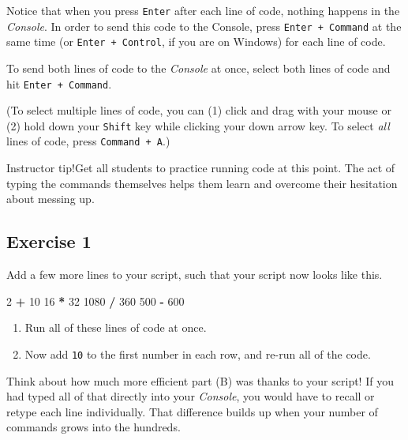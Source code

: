 \documentclass[
]{book}
\newenvironment{Shaded}{\begin{snugshade}}{\end{snugshade}}
\newcommand{\DecValTok}[1]{\textcolor[rgb]{0.00,0.00,0.81}{#1}}
\newcommand{\OperatorTok}[1]{\textcolor[rgb]{0.81,0.36,0.00}{\textbf{#1}}}
\newcommand{\StringTok}[1]{\textcolor[rgb]{0.31,0.60,0.02}{#1}}
\providecommand{\tightlist}{%
  \setlength{\itemsep}{0pt}\setlength{\parskip}{0pt}}
\begin{document}
Notice that when you press \texttt{Enter} after each line of code, nothing happens in the \emph{Console}. In order to send this code to the Console, press \texttt{Enter\ +\ Command} at the same time (or \texttt{Enter\ +\ Control}, if you are on Windows) for each line of code.

To send both lines of code to the \emph{Console} at once, select both lines of code and hit \texttt{Enter\ +\ Command}.

(To select multiple lines of code, you can (1) click and drag with your mouse or (2) hold down your \texttt{Shift} key while clicking your down arrow key. To select \emph{all} lines of code, press \texttt{Command\ +\ A}.)

Instructor tip!Get all students to practice running code at this point. The act of typing the commands themselves helps them learn and overcome their hesitation about messing up.

\hypertarget{exercise-1-1}{%
\subsection*{Exercise 1}\label{exercise-1-1}}

Add a few more lines to your script, such that your script now looks like this.

\begin{Shaded}
\begin{Highlighting}[]
\DecValTok{2}  \OperatorTok{+}\StringTok{ }\DecValTok{10}
\DecValTok{16} \OperatorTok{*}\StringTok{ }\DecValTok{32}
\DecValTok{1080} \OperatorTok{/}\StringTok{ }\DecValTok{360}
\DecValTok{500} \OperatorTok{-}\StringTok{ }\DecValTok{600}
\end{Highlighting}
\end{Shaded}

\begin{enumerate}
\def\labelenumi{(\Alph{enumi})}
\tightlist
\item
  Run all of these lines of code at once.\\
\item
  Now add \texttt{10} to the first number in each row, and re-run all of the code.
\end{enumerate}

Think about how much more efficient part (B) was thanks to your script! If you had typed all of that directly into your \emph{Console}, you would have to recall or retype each line individually. That difference builds up when your number of commands grows into the hundreds.
\end{document}
